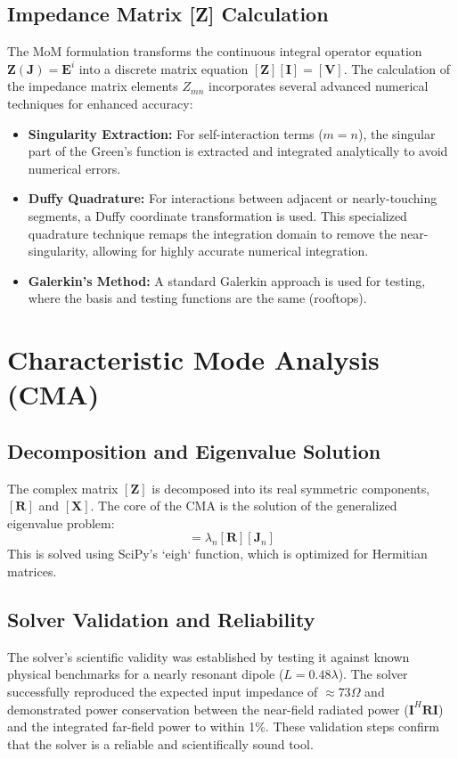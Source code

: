 \documentclass[11pt, a4paper]{report}
\begin{document}
\subsection{Impedance Matrix [Z] Calculation}
The MoM formulation transforms the continuous integral operator equation $\mathbf{Z}(\mathbf{J}) = \mathbf{E}^i$ into a discrete matrix equation $[\mathbf{Z}][\mathbf{I}] = [\mathbf{V}]$. The calculation of the impedance matrix elements $Z_{mn}$ incorporates several advanced numerical techniques for enhanced accuracy:
\begin{itemize}
    \item \textbf{Singularity Extraction:} For self-interaction terms ($m=n$), the singular part of the Green's function is extracted and integrated analytically to avoid numerical errors.
    \item \textbf{Duffy Quadrature:} For interactions between adjacent or nearly-touching segments, a Duffy coordinate transformation is used. This specialized quadrature technique remaps the integration domain to remove the near-singularity, allowing for highly accurate numerical integration.
    \item \textbf{Galerkin's Method:} A standard Galerkin approach is used for testing, where the basis and testing functions are the same (rooftops).
\end{itemize}

\section{Characteristic Mode Analysis (CMA)}
\subsection{Decomposition and Eigenvalue Solution}
The complex matrix $[\mathbf{Z}]$ is decomposed into its real symmetric components, $[\mathbf{R}]$ and $[\mathbf{X}]$. The core of the CMA is the solution of the generalized eigenvalue problem:
\begin{equation}
    [\mathbf{X}][\mathbf{J}_n] = \lambda_n [\mathbf{R}][\mathbf{J}_n]
\end{equation}
This is solved using SciPy's `eigh` function, which is optimized for Hermitian matrices.

\subsection{Solver Validation and Reliability}
The solver's scientific validity was established by testing it against known physical benchmarks for a nearly resonant dipole ($L=0.48\lambda$). The solver successfully reproduced the expected input impedance of $\approx 73 \Omega$ and demonstrated power conservation between the near-field radiated power ($\mathbf{I}^H \mathbf{R} \mathbf{I}$) and the integrated far-field power to within 1\%. These validation steps confirm that the solver is a reliable and scientifically sound tool.
\end{document}
